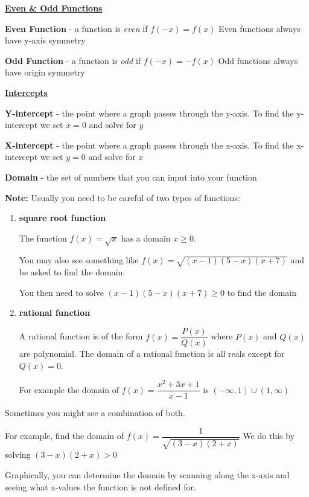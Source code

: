 \documentclass[12pt]{article}
\newenvironment{myindentpar}[1]%
     {\begin{list}{}%
             {\setlength{\leftmargin}{#1}}%
             \item[]%
     }
     {\end{list}}
\begin{document}
{\bf \underline{Even \& Odd Functions}}
\begin{myindentpar}{1cm}
\textbf{Even Function} - a function is \textit{even} if $f(-x) = f(x)$ Even functions always have y-axis symmetry

\textbf{Odd Function} - a function is \textit{odd} if $f(-x) = -f(x)$ Odd functions always have origin symmetry
\end{myindentpar}

{\bf \underline{Intercepts}}
\begin{myindentpar}{1cm}
\textbf{Y-intercept} - the point where a graph passes through the y-axis. To find the y-intercept we set $x=0$ and solve for $y$

\textbf{X-intercept} - the point where a graph passes through the x-axis. To find the x-intercept we set $y=0$ and solve for $x$
\end{myindentpar}
\newpage
\textbf{Domain} - the set of numbers that you can input into your function

\begin{myindentpar}{1cm}
\textbf{Note:} Usually you need to be careful of two types of functions: 

\begin{enumerate}
\item \textbf{square root function} 

The function $f(x) = \sqrt{x}$ has a domain $x \geq 0$. 

You may also see something like $f(x) = \sqrt{(x-1)(5-x)(x+7)}$ and be asked to find the domain. 

You then need to solve $(x-1)(5-x)(x+7) \geq 0$ to find the domain
\item \textbf{rational function}

 A rational function is of the form $f(x) = \dfrac{P(x)}{Q(x)}$ where $P(x)$ and $Q(x)$ are polynomial. The domain of a rational function is all reals except for $Q(x)=0.$ 

For example the domain of $f(x) = \dfrac{x^2+3x+1}{x-1}$ is $(-\infty, 1) \cup (1, \infty)$
\end{enumerate}

 Sometimes you might see a combination of both. 

For example, find the domain of $f(x) = \dfrac{1}{\sqrt{(3-x)(2+x)}}$ We do this by solving $(3-x)(2+x)>0$
\end{myindentpar}

Graphically, you can determine the domain by scanning along the x-axis and seeing what x-values the function is not defined for.
\end{document}
